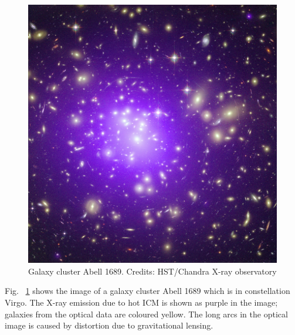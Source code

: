 \begin{figure}[ht]
\includegraphics[width = \columnwidth]{figs/Abell_1689.jpg}
\caption{Galaxy cluster Abell 1689. Credits: HST/Chandra X-ray observatory}
\label{cluster}
\end{figure}

Fig. ~\ref{cluster} shows the image of a galaxy cluster Abell 1689 which is in constellation Virgo. The X-ray emission due to hot ICM is shown as purple in the image; galaxies from the optical data are coloured yellow. The long arcs in the optical image is caused by distortion due to gravitational lensing. \\

